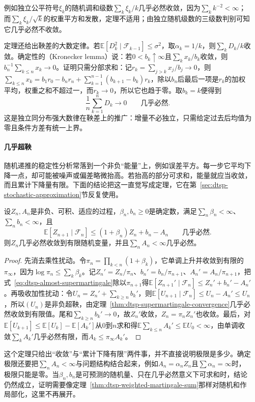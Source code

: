 例如独立公平符号$\xi_k$的随机调和级数$\sum_k\xi_k/k$几乎必然收敛，因为$\sum_k k^{-2}<\infty$；而$\sum_k\xi_k/\sqrt k$的权重平方和发散，定理不适用；由独立随机级数的三级数判别可知它几乎必然不收敛。

定理还给出鞅差的大数定律。若$\mathbb E[D_k^2\mid\mathcal F_{k-1}]\leq\sigma^2$，取$\alpha_k=1/k$，则$\sum_kD_k/k$收敛。确定性的（Kronecker lemma）说：若$0<b_k\uparrow\infty$且$\sum_kx_k/b_k$收敛，则$b_n^{-1}\sum_{k\leq n}x_k\to0$。证明只需分部求和：记$r_k=\sum_{j>k}x_j/b_j\to0$，则$\sum_{k\leq n}x_k=b_1r_0-b_nr_n+\sum_{k=1}^{n-1}(b_{k+1}-b_k)r_k$，除以$b_n$后最后一项是$r_k$的加权平均，权重之和不超过一，而$r_k\to0$，所以它也趋于零。取$b_k=k$便得到
\begin{equation}
  \frac1n\sum_{k=1}^nD_k\longrightarrow0\qquad\text{几乎必然}.
  \label{eq:dtsp-martingale-lln}
\end{equation}
这是独立同分布强大数律在鞅差上的推广：增量不必独立，只需给定过去后均值为零且条件方差有统一上界。

\paragraph{几乎超鞅}
随机递推的稳定性分析常落到一个非负“能量”上，例如误差平方。每一步它平均下降一点，却可能被噪声或偏差略微抬高。若抬高的部分可求和，能量就应当收敛，而且累计下降量有限。下面的结论把这一直觉写成定理，它在第~\ref{sec:dtsp-stochastic-approximation}节反复使用。

\begin{theorem}[几乎超鞅收敛]
  \label{thm:dtsp-almost-supermartingale}
  设$Z_n,A_n$是非负、可积、适应的过程，$\beta_n,b_n\geq0$是确定数，满足$\sum_n\beta_n<\infty$、$\sum_nb_n<\infty$，且
  \begin{equation}
    \mathbb E[Z_{n+1}\mid\mathcal F_n]\leq(1+\beta_n)Z_n+b_n-A_n\qquad\text{几乎必然}.
    \label{eq:dtsp-almost-supermartingale}
  \end{equation}
  则$Z_n$几乎必然收敛到有限随机变量，并且$\sum_nA_n<\infty$几乎必然。
\end{theorem}

\begin{proof}
先消去乘性扰动。令$\pi_n=\prod_{k<n}(1+\beta_k)$，它单调上升并收敛到有限的$\pi_\infty$，因为$\log\pi_n\leq\sum_k\beta_k$。记$Z_n'=Z_n/\pi_n$、$b_n'=b_n/\pi_{n+1}$、$A_n'=A_n/\pi_{n+1}$，把式~\eqref{eq:dtsp-almost-supermartingale}除以$\pi_{n+1}$得$\mathbb E[Z_{n+1}'\mid\mathcal F_n]\leq Z_n'+b_n'-A_n'$。再吸收加性扰动：令$U_n=Z_n'+\sum_{k\geq n}b_k'$，则$\mathbb E[U_{n+1}\mid\mathcal F_n]\leq U_n-A_n'\leq U_n$，所以$(U_n)$是非负超鞅，由定理~\ref{thm:dtsp-supermartingale-convergence}几乎必然收敛到有限值。尾和$\sum_{k\geq n}b_k'\to0$，故$Z_n'$收敛，$Z_n=\pi_nZ_n'$也收敛。最后，对$\mathbb E[U_{k+1}]\leq\mathbb E[U_k]-\mathbb E[A_k']$从$0$到$n$求和得$\mathbb E\sum_{k\leq n}A_k'\leq\mathbb EU_0<\infty$，由单调收敛$\sum_kA_k'$几乎必然有限，而$A_k\leq\pi_\infty A_k'$。
\end{proof}

这个定理只给出“收敛”与“累计下降有限”两件事，并不直接说明极限是多少。确定极限还要把$\sum_nA_n<\infty$与问题结构结合起来，例如$A_n=\alpha_nZ_n$且$\sum\alpha_n=\infty$时，极限只能是零。当$\beta_n,b_n$是可预测的随机量、只在几乎必然意义下可求和时，结论仍然成立，证明需要像定理~\ref{thm:dtsp-weighted-martingale-sum}那样对随机和作局部化，这里不再展开。
